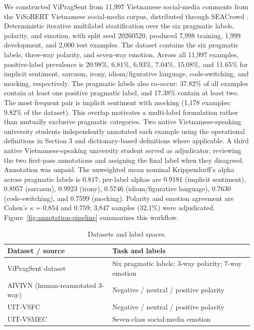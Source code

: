 We constructed ViPragSent from 11,997 Vietnamese social-media comments from the ViSoBERT Vietnamese social-media corpus, distributed through SEACrowd \citep{nguyen-etal-2023-visobert,lovenia-etal-2024-seacrowd}. Deterministic iterative multilabel stratification over the six pragmatic labels, polarity, and emotion, with split seed 20260520, produced 7,998 training, 1,999 development, and 2,000 test examples. The dataset contains the six pragmatic labels, three-way polarity, and seven-way emotion. Across all 11,997 examples, positive-label prevalence is 20.98\%, 6.81\%, 6.93\%, 7.04\%, 15.08\%, and 11.65\% for implicit sentiment, sarcasm, irony, idiom/figurative language, code-switching, and mocking, respectively. The pragmatic labels also co-occur: 37.82\% of all examples contain at least one positive pragmatic label, and 17.38\% contain at least two. The most frequent pair is implicit sentiment with mocking (1,178 examples; 9.82\% of the dataset). This overlap motivates a multi-label formulation rather than mutually exclusive pragmatic categories. Two native Vietnamese-speaking university students independently annotated each example using the operational definitions in Section 3 and dictionary-based definitions where applicable. A third native Vietnamese-speaking university student served as adjudicator, reviewing the two first-pass annotations and assigning the final label when they disagreed. Annotation was unpaid. The unweighted mean nominal Krippendorff's alpha across pragmatic labels is $0.817$; per-label alphas are 0.9181 (implicit sentiment), 0.8957 (sarcasm), 0.9923 (irony), 0.5746 (idiom/figurative language), 0.7630 (code-switching), and 0.7599 (mocking). Polarity and emotion agreement are Cohen's $\kappa=0.854$ and $0.759$; 3,847 samples (32.1\%) were adjudicated. Figure~\ref{fig:annotation-pipeline} summarizes this workflow.

\begin{table}[tb]
\centering
\small
\setlength{\tabcolsep}{2pt}
\begin{tabularx}{\columnwidth}{>{\raggedright\arraybackslash}p{1.45in} >{\raggedright\arraybackslash}X}
\hline
Dataset / source & Task and labels \\
\hline
ViPragSent dataset & Six pragmatic labels; 3-way polarity; 7-way emotion \\
AIVIVN (human-reannotated 3-way) & Negative / neutral / positive polarity \\
UIT-VSFC & Negative / neutral / positive polarity \\
UIT-VSMEC & Seven-class social-media emotion \\
\hline
\end{tabularx}
\caption{Datasets and label spaces.}
\label{tab:data-annotation}
\end{table}

